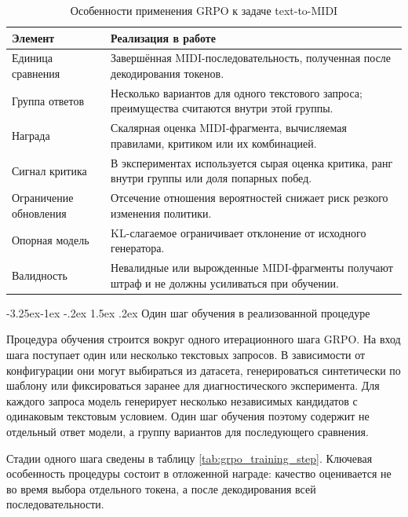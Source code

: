 \documentclass[a4paper,12pt]{extarticle}
\makeatletter
\renewcommand\subsection{\@startsection{subsection}{2}{\z@}%
  {-3.25ex\@plus -1ex \@minus -.2ex}%
  {1.5ex \@plus .2ex}%
  {\normalfont\large\bfseries\Needspace{6\baselineskip}}}
\makeatother
\begin{document}
\begin{table}[ht]
\centering
\caption{Особенности применения GRPO к задаче text-to-MIDI}
\label{tab:grpo_midi_specifics}
\begin{tabular}{|p{}|p{}|}
\hline
\textbf{Элемент} & \textbf{Реализация в работе} \\
\hline
Единица сравнения & Завершённая MIDI-последовательность, полученная после декодирования токенов. \\
\hline
Группа ответов & Несколько вариантов для одного текстового запроса; преимущества считаются внутри этой группы. \\
\hline
Награда & Скалярная оценка MIDI-фрагмента, вычисляемая правилами, критиком или их комбинацией. \\
\hline
Сигнал критика & В экспериментах используется сырая оценка критика, ранг внутри группы или доля попарных побед. \\
\hline
Ограничение обновления & Отсечение отношения вероятностей снижает риск резкого изменения политики. \\
\hline
Опорная модель & KL-слагаемое ограничивает отклонение от исходного генератора. \\
\hline
Валидность & Невалидные или вырожденные MIDI-фрагменты получают штраф и не должны усиливаться при обучении. \\
\hline
\end{tabular}
\end{table}

\subsection{Один шаг обучения в реализованной процедуре}

Процедура обучения строится вокруг одного итерационного шага GRPO.
На вход шага поступает один или несколько текстовых запросов.
В зависимости от конфигурации они могут выбираться из датасета,
генерироваться синтетически по шаблону или фиксироваться заранее для
диагностического эксперимента. Для каждого запроса модель генерирует
несколько независимых кандидатов с одинаковым текстовым
условием. Один шаг обучения поэтому содержит не отдельный ответ модели, а
группу вариантов для последующего сравнения.

Стадии одного шага сведены в таблицу \ref{tab:grpo_training_step}.
Ключевая особенность процедуры состоит в отложенной награде: качество
оценивается не во время выбора отдельного токена, а после декодирования всей
последовательности.
\end{document}
